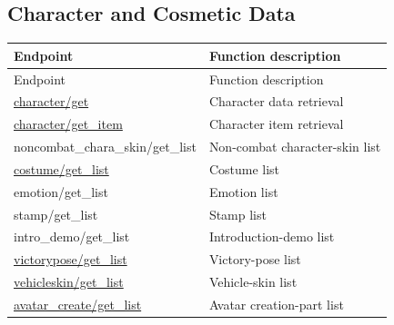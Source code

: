 \subsection{Character and Cosmetic Data}

\begin{longtable}{>{\ttfamily}p{}p{}}
\toprule
Endpoint & Function description \\
\midrule
\endfirsthead%

\toprule
Endpoint & Function description \\
\midrule
\endhead%

\hyperref[subsec:api_character_get]
    {character/get}
    & Character data retrieval \\

\hyperref[subsec:api_character_get_item]
    {character/get\_item}
    & Character item retrieval \\

noncombat\_chara\_skin/get\_list
    & Non-combat character-skin list \\

\hyperref[subsec:api_costume_get_list]
    {costume/get\_list}
    & Costume list \\

emotion/get\_list
    & Emotion list \\

stamp/get\_list
    & Stamp list \\

intro\_demo/get\_list
    & Introduction-demo list \\

\hyperref[subsec:api_victorypose_get_list]
    {victorypose/get\_list}
    & Victory-pose list \\

\hyperref[subsec:api_vehicleskin_get_list]
    {vehicleskin/get\_list}
    & Vehicle-skin list \\

\hyperref[subsec:api_avatar_create_get_list]
    {avatar\_create/get\_list}
    & Avatar creation-part list \\

\bottomrule
\end{longtable}